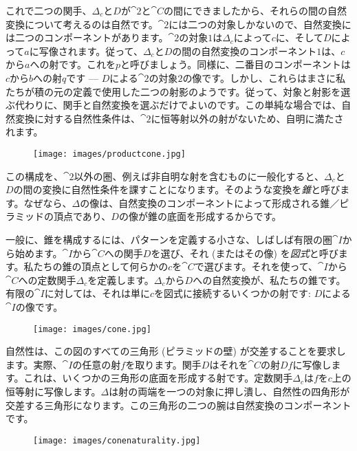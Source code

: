 \noindent
これで二つの関手、$\Delta_c$と$D$が$\cat{2}$と$\cat{C}$の間にできましたから、それらの間の自然変換について考えるのは自然です。$\cat{2}$には二つの対象しかないので、自然変換には二つのコンポーネントがあります。$\cat{2}$の対象$1$は$\Delta_c$によって$c$に、そして$D$によって$a$に写像されます。従って、$\Delta_c$と$D$の間の自然変換のコンポーネント$1$は、$c$から$a$への射です。これを$p$と呼びましょう。同様に、二番目のコンポーネントは$c$から$b$への射$q$です --- $D$による$\cat{2}$の対象$2$の像です。しかし、これらはまさに私たちが積の元の定義で使用した二つの射影のようです。従って、対象と射影を選ぶ代わりに、関手と自然変換を選ぶだけでよいのです。この単純な場合では、自然変換に対する自然性条件は、$\cat{2}$に恒等射以外の射がないため、自明に満たされます。

\begin{figure}[H]
  \centering
  \texttt{[image: images/productcone.jpg]}
\end{figure}

\noindent
この構成を、$\cat{2}$以外の圏、例えば非自明な射を含むものに一般化すると、$\Delta_c$と$D$の間の変換に自然性条件を課すことになります。そのような変換を\emph{錐}と呼びます。なぜなら、$\Delta$の像は、自然変換のコンポーネントによって形成される錐／ピラミッドの頂点であり、$D$の像が錐の底面を形成するからです。

一般に、錐を構成するには、パターンを定義する小さな、しばしば有限の圏$\cat{I}$から始めます。$\cat{I}$から$\cat{C}$への関手$D$を選び、それ (またはその像) を\emph{図式}と呼びます。私たちの錐の頂点として何らかの$c$を$\cat{C}$で選びます。それを使って、$\cat{I}$から$\cat{C}$への定数関手$\Delta_c$を定義します。$\Delta_c$から$D$への自然変換が、私たちの錐です。有限の$\cat{I}$に対しては、それは単に$c$を図式に接続するいくつかの射です: $D$による$\cat{I}$の像です。

\begin{figure}[H]
  \centering
  \texttt{[image: images/cone.jpg]}
\end{figure}

\noindent
自然性は、この図のすべての三角形 (ピラミッドの壁) が交差することを要求します。実際、$\cat{I}$の任意の射$f$を取ります。関手$D$はそれを$\cat{C}$の射$Df$に写像します。これは、いくつかの三角形の底面を形成する射です。定数関手$\Delta_c$は$f$を$c$上の恒等射に写像します。$\Delta$は射の両端を一つの対象に押し潰し、自然性の四角形が交差する三角形になります。この三角形の二つの腕は自然変換のコンポーネントです。

\begin{figure}[H]
  \centering
  \texttt{[image: images/conenaturality.jpg]}
\end{figure}

